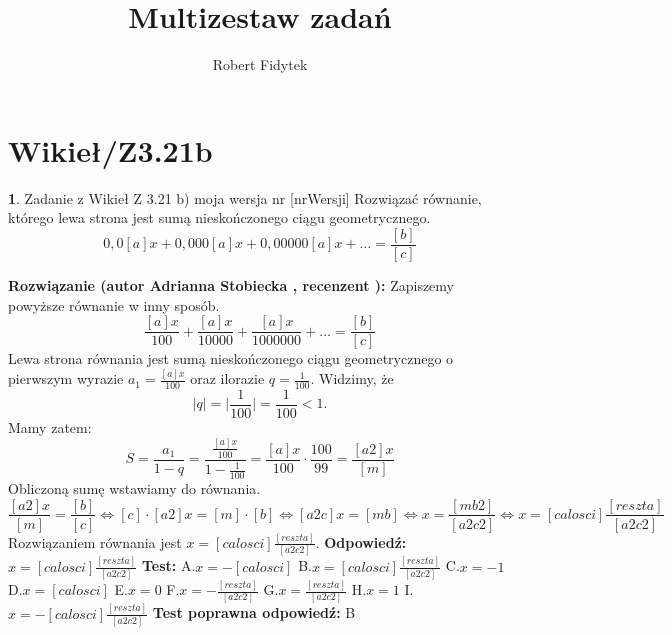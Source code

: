 \documentclass[12pt, a4paper]{article}
\title{Multizestaw zadań}
\author{Robert Fidytek}
\date{}
\theoremstyle{definition} %
\newtheorem{zad}{}
\newcommand{\kategoria}[1]{\section{#1}} %
\newcommand{\zadStart}[1]{\begin{zad}#1\newline} %
\newcommand{\zadStop}{\end{zad}}   %
\newcommand{\rozwStart}[2]{\noindent \textbf{Rozwiązanie (autor #1 , recenzent #2): }\newline} %
\newcommand{\rozwStop}{\newline}                                            %
\newcommand{\odpStart}{\noindent \textbf{Odpowiedź:}\newline}    %
\newcommand{\odpStop}{\newline}                                             %
\newcommand{\testStart}{\noindent \textbf{Test:}\newline} %
\newcommand{\testStop}{\newline} %
\newcommand{\kluczStart}{\noindent \textbf{Test poprawna odpowiedź:}\newline} %
\newcommand{\kluczStop}{\newline} %
\begin{document}
\maketitle


\kategoria{Wikieł/Z3.21b}
\zadStart{Zadanie z Wikieł Z 3.21 b) moja wersja nr [nrWersji]}
Rozwiązać równanie, którego lewa strona jest sumą nieskończonego ciągu geometrycznego.
$$0,0[a]x+0,000[a]x+0,00000[a]x+\dots=\frac{[b]}{[c]}$$
\zadStop
\rozwStart{Adrianna Stobiecka}{}
Zapiszemy powyższe równanie w inny sposób.
$$\frac{[a]x}{100}+\frac{[a]x}{10000}+\frac{[a]x}{1000000}+\dots=\frac{[b]}{[c]}$$
Lewa strona równania jest sumą nieskończonego ciągu geometrycznego o pierwszym wyrazie $a_1=\frac{[a]x}{100}$ oraz ilorazie $q=\frac{1}{100}$. Widzimy, że 
$$|q|=\bigg|\frac{1}{100}\bigg|=\frac{1}{100}<1.$$
Mamy zatem:
$$S=\frac{a_1}{1-q}=\frac{\frac{[a]x}{100}}{1-\frac{1}{100}}=\frac{[a]x}{100}\cdot\frac{100}{99}=\frac{[a2]x}{[m]}$$
Obliczoną sumę wstawiamy do równania.
$$\frac{[a2]x}{[m]}=\frac{[b]}{[c]}\Leftrightarrow [c]\cdot[a2]x=[m]\cdot[b]\Leftrightarrow[a2c]x=[mb]\Leftrightarrow x=\frac{[mb2]}{[a2c2]}\Leftrightarrow x=[calosci]\frac{[reszta]}{[a2c2]}$$
Rozwiązaniem równania jest $x=[calosci]\frac{[reszta]}{[a2c2]}$.
\rozwStop
\odpStart
$x=[calosci]\frac{[reszta]}{[a2c2]}$
\odpStop
\testStart
A.$x=-[calosci]$
B.$x=[calosci]\frac{[reszta]}{[a2c2]}$
C.$x=-1$
D.$x=[calosci]$
E.$x=0$
F.$x=-\frac{[reszta]}{[a2c2]}$
G.$x=\frac{[reszta]}{[a2c2]}$
H.$x=1$
I.$x=-[calosci]\frac{[reszta]}{[a2c2]}$
\testStop
\kluczStart
B
\kluczStop
\end{document}
